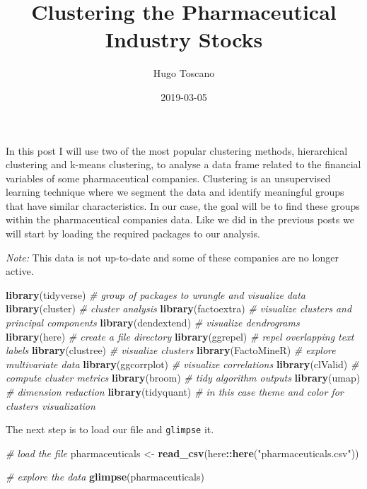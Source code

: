 \documentclass[]{article}
\title{Clustering the Pharmaceutical Industry Stocks}
\author{Hugo Toscano}
\date{2019-03-05}
\newenvironment{Shaded}{\begin{snugshade}}{\end{snugshade}}
\newcommand{\KeywordTok}[1]{\textcolor[rgb]{0.13,0.29,0.53}{\textbf{#1}}}
\newcommand{\StringTok}[1]{\textcolor[rgb]{0.31,0.60,0.02}{#1}}
\newcommand{\CommentTok}[1]{\textcolor[rgb]{0.56,0.35,0.01}{\textit{#1}}}
\newcommand{\OperatorTok}[1]{\textcolor[rgb]{0.81,0.36,0.00}{\textbf{#1}}}
\newcommand{\NormalTok}[1]{#1}
\begin{document}
\maketitle

In this post I will use two of the most popular clustering methods,
hierarchical clustering and k-means clustering, to analyse a data frame
related to the financial variables of some pharmaceutical companies.
Clustering is an unsupervised learning technique where we segment the
data and identify meaningful groups that have similar characteristics.
In our case, the goal will be to find these groups within the
pharmaceutical companies data. Like we did in the previous posts we will
start by loading the required packages to our analysis.

\emph{Note:} This data is not up-to-date and some of these companies are
no longer active.

\begin{Shaded}
\begin{Highlighting}[]
\KeywordTok{library}\NormalTok{(tidyverse) }\CommentTok{# group of packages to wrangle and visualize data}
\KeywordTok{library}\NormalTok{(cluster) }\CommentTok{# cluster analysis}
\KeywordTok{library}\NormalTok{(factoextra) }\CommentTok{# visualize clusters and principal components}
\KeywordTok{library}\NormalTok{(dendextend) }\CommentTok{# visualize dendrograms}
\KeywordTok{library}\NormalTok{(here) }\CommentTok{# create a file directory}
\KeywordTok{library}\NormalTok{(ggrepel) }\CommentTok{# repel overlapping text labels}
\KeywordTok{library}\NormalTok{(clustree) }\CommentTok{# visualize clusters}
\KeywordTok{library}\NormalTok{(FactoMineR) }\CommentTok{# explore multivariate data}
\KeywordTok{library}\NormalTok{(ggcorrplot) }\CommentTok{# visualize correlations}
\KeywordTok{library}\NormalTok{(clValid) }\CommentTok{# compute cluster metrics}
\KeywordTok{library}\NormalTok{(broom) }\CommentTok{# tidy algorithm outputs}
\KeywordTok{library}\NormalTok{(umap) }\CommentTok{# dimension reduction}
\KeywordTok{library}\NormalTok{(tidyquant) }\CommentTok{# in this case theme and color for clusters visualization}
\end{Highlighting}
\end{Shaded}

The next step is to load our file and \texttt{glimpse} it.

\begin{Shaded}
\begin{Highlighting}[]
\CommentTok{# load the file}
\NormalTok{pharmaceuticals <-}\StringTok{ }\KeywordTok{read_csv}\NormalTok{(here}\OperatorTok{::}\KeywordTok{here}\NormalTok{(}\StringTok{"pharmaceuticals.csv"}\NormalTok{))}

\CommentTok{# explore the data}
\KeywordTok{glimpse}\NormalTok{(pharmaceuticals)}
\end{Highlighting}
\end{Shaded}
\end{document}
